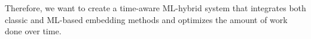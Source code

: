 % 
% 
% 
% 
% 

Therefore, we want to create a time-aware ML-hybrid system that integrates both classic and ML-based embedding methods and optimizes the amount of work done over time.


